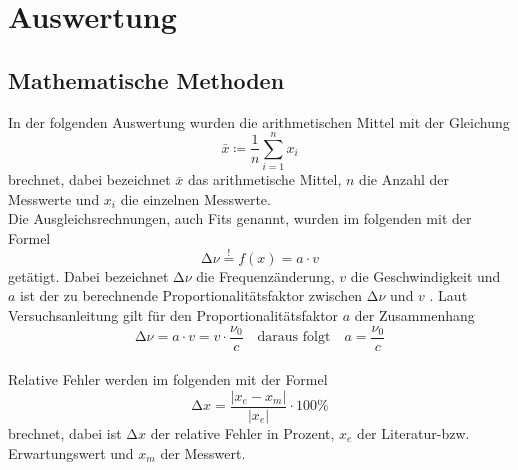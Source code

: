 \section{Auswertung}
\label{sec:Auswertung}
\subsection{Mathematische Methoden}
In der folgenden Auswertung wurden die arithmetischen Mittel mit der
Gleichung
\begin{equation}
  \bar{x} \coloneq \frac{1}{n} \sum_{i=1}^n x_i
  \label{eqn:aM}
\end{equation}
brechnet, dabei bezeichnet $\bar{x}$ das arithmetische Mittel, $n$ die Anzahl
der Messwerte und $x_i$ die einzelnen Messwerte. \\
Die Ausgleichsrechnungen, auch Fits genannt, wurden im folgenden mit der
Formel
\begin{equation}
  \increment \nu \stackrel{!}{=} f(x) = a\cdot v
  \label{eqn:fit}
\end{equation}
getätigt. Dabei bezeichnet $\increment \nu$ die Frequenzänderung, $v$ die
Geschwindigkeit und $a$ ist der zu berechnende Proportionalitätsfaktor zwischen
$ \increment \nu $ und $v$ . Laut Versuchsanleitung \cite{Anleitung} gilt für den
Proportionalitätsfaktor $a$ der Zusammenhang
\begin{equation}
  \increment \nu = a\cdot v = v\cdot\frac{\nu_0}{c} \quad \text{daraus folgt} \quad
  a = \frac{\nu_0}{c}
  \label{eqn:a}
\end{equation}
\\
Relative Fehler werden im folgenden mit der Formel
\begin{equation*}
  \increment x = \frac{\lvert x_e - x_m \rvert}{\lvert x_e \rvert}\cdot 100\%
\end{equation*}
brechnet, dabei ist $\increment x $ der relative Fehler in Prozent, $x_e$ der
Literatur-bzw. Erwartungswert und $ x_m$ der Messwert.
